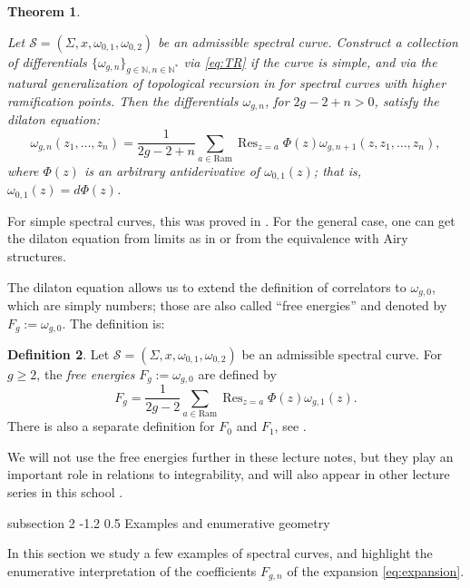 \documentclass[reqno,oneside,11pt]{amsart}
\makeatletter
\theoremstyle{plain}
\newtheorem{theorem}{Theorem}[section]
\theoremstyle{definition}
\newtheorem{definition}[theorem]{Definition}
\theoremstyle{remark}
\numberwithin{equation}{section}
\renewcommand{\subsection}{\@startsection
{subsection}%
{2}%
{\z@}%
{-1.2\baselineskip}%
{0.5\baselineskip}%
{\normalfont \bf \normalsize}} %
\DeclareMathOperator*{\Res}{Res}
\newcommand{\Ra}{\text{Ram}}
\makeatother
\begin{document}
\begin{theorem}\label{t:dilaton}

Let $\mathcal{S} = (\Sigma,x,\omega_{0,1}, \omega_{0,2})$ be an admissible spectral curve. Construct a collection of differentials $\{\omega_{g,n} \}_{g \in \mathbb{N}, n \in \mathbb{N}^* }$ via \eqref{eq:TR} if the curve is simple, and via the natural generalization of topological recursion in \cite{BE13} for spectral curves with higher ramification points. Then the differentials $\omega_{g,n}$, for $2g-2+n>0$, satisfy the dilaton equation:
\begin{equation}\label{eq:dilaton}
\omega_{g,n}(z_1,\ldots,z_n) = \frac{1}{2g-2+n} \sum_{a \in \Ra} \Res_{z=a} \Phi(z) \omega_{g,n+1}(z,z_1,\ldots,z_n),
\end{equation}
where $\Phi(z)$ is an arbitrary antiderivative of $\omega_{0,1}(z)$; that is, $\omega_{0,1}(z) = d \Phi(z)$.
\end{theorem}

For simple spectral curves, this was proved in \cite{EO07}. For the general case, one can get the dilaton equation from limits as in \cite{BBCKS23} or from the equivalence with Airy structures.

The dilaton equation allows us to extend the definition of correlators to $\omega_{g,0}$, which are simply numbers; those are also called ``free energies'' and denoted by $F_g := \omega_{g,0}$. The definition is:

\begin{definition}\label{d:fe}
Let $\mathcal{S} = (\Sigma,x,\omega_{0,1}, \omega_{0,2})$ be an admissible spectral curve. For $g \geq 2$, the \emph{free energies} $F_g := \omega_{g,0}$ are defined by
\begin{equation}
F_g = \frac{1}{2g-2} \sum_{a \in \Ra} \Res_{z=a} \Phi(z) \omega_{g,1}(z).
\end{equation}
There is also a separate definition for $F_0$ and $F_1$, see \cite{EO07}.
\end{definition}

We will not use the free energies further in these lecture notes, but they play an important role in relations to integrability, and will also appear in other lecture series in this school \cite{Li24}.

\subsection{Examples and enumerative geometry}

In this section we study a few examples of spectral curves, and highlight the enumerative interpretation of the coefficients $F_{g,n}$ of the expansion \eqref{eq:expansion}.
\end{document}
